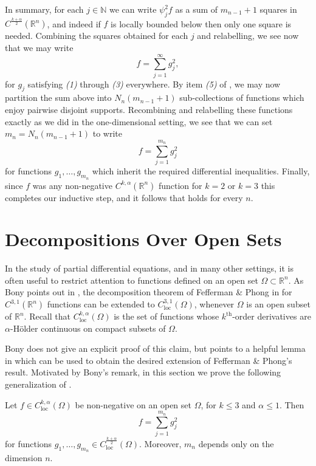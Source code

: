 \documentclass[oneside,hidelinks,indentfirst,10pt]{book}
\begin{document}
In summary, for each \(j\in\mathbb{N}\) we can write \(\psi_j^2f\) as a sum of \(m_{n-1}+1\) squares in \(C^\frac{k+\alpha}{2}(\mathbb{R}^n)\), and indeed if \(f\) is locally bounded below then only one square is needed. Combining the squares obtained for each \(j\) and relabelling, we see now that we may write
\[
    f=\sum_{j=1}^\infty g_j^2,
\]
for \(g_j\) satisfying \textit{(1)} through \textit{(3)} everywhere. By item \textit{(5)} of , we may now partition the sum above into \(N_n(m_{n-1}+1)\) sub-collections of functions which enjoy pairwise disjoint supports. Recombining and relabelling these functions exactly as we did in the one-dimensional setting, we see that we can set \(m_n=N_n(m_{n-1}+1)\) to write
\[
    f=\sum_{j=1}^{m_n}g_j^2
\]
for functions \(g_1,\dots,g_{m_n}\) which inherit the required differential inequalities. Finally, since \(f\) was any non-negative \(C^{k,\alpha}(\mathbb{R}^n)\) function for \(k=2\) or \(k=3\) this completes our inductive step, and it follows that  holds for every \(n\).\hfill\qedsymbol



\section{Decompositions Over Open Sets}\label{sec:ext}


In the study of partial differential equations, and in many other settings, it is often useful to restrict attention to functions defined on an open set \(\Omega\subset\mathbb{R}^n\). As Bony points out in \cite{Bony2}, the decomposition theorem of Fefferman \& Phong in \cite{Fefferman-Phong} for \(C^{3,1}(\mathbb{R}^n)\) functions can be extended to \(C^{3,1}_{\mathrm{loc}}(\Omega)\), whenever \(\Omega\) is an open subset of \(\mathbb{R}^n\). Recall that \(C^{k,\alpha}_{\mathrm{loc}}(\Omega)\) is the set of functions whose \(k^\mathrm{th}\)-order derivatives are \(\alpha\)-H\"older continuous on compact subsets of \(\Omega\). 


Bony does not give an explicit proof of this claim, but points to a helpful lemma in \cite{Bony} which can be used to obtain the desired extension of Fefferman \& Phong's result. Motivated by Bony's remark, in this section we prove the following generalization of .


\begin{thm}\label{thm:locdecomp}
Let \(f\in C_{\mathrm{loc}}^{k,\alpha}(\Omega)\) be non-negative on an open set \(\Omega\), for \(k\leq 3\) and \(\alpha\leq 1\). Then
\[
    f=\sum_{j=1}^{m_n}g_j^2
\]
for functions \(g_1,\dots, g_{m_n}\in C^{\frac{k+\alpha}{2}}_{\mathrm{loc}}(\Omega)\). Moreover, \(m_n\) depends only on the dimension \(n\).
\end{thm}
\end{document}
